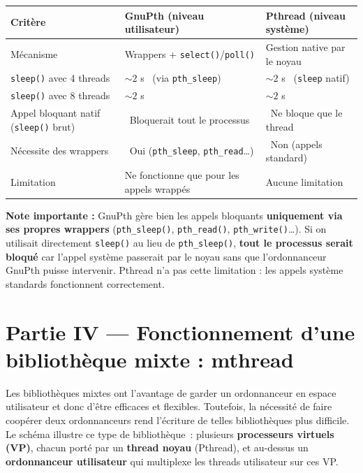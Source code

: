 \documentclass[11pt,a4paper]{article}
\newcommand{\cmark}{\ding{51}}
\newcommand{\xmark}{\ding{55}}
\let\oldtexttt\texttt
\renewcommand{\texttt}[1]{\oldtexttt{\color{keyword}#1}}
\begin{document}
\begin{center}
\renewcommand{\arraystretch}{1.2}
\setlength{\tabcolsep}{4pt}
\small
\begin{tabularx}{\textwidth}{|>{\raggedright\arraybackslash}p{2.8cm}|>{\raggedright\arraybackslash}X|>{\raggedright\arraybackslash}X|}
\hline
\textbf{Critère} & \textbf{GnuPth (niveau utilisateur)} & \textbf{Pthread (niveau système)} \\
\hline
Mécanisme & Wrappers + \texttt{select()}/\texttt{poll()} & Gestion native par le noyau \\
\hline
\texttt{sleep()} avec 4 threads & \(\sim 2\) s \cmark\ (via \texttt{pth\_sleep}) & \(\sim 2\) s \cmark\ (\texttt{sleep} natif) \\
\hline
\texttt{sleep()} avec 8 threads & \(\sim 2\) s \cmark & \(\sim 2\) s \cmark \\
\hline
Appel bloquant natif (\texttt{sleep()} brut) & \xmark\ Bloquerait tout le processus & \cmark\ Ne bloque que le thread \\
\hline
Nécessite des wrappers & \cmark\ Oui (\texttt{pth\_sleep}, \texttt{pth\_read}\ldots) & \xmark\ Non (appels standard) \\
\hline
Limitation & Ne fonctionne que pour les appels wrappés & Aucune limitation \\
\hline
\end{tabularx}
\end{center}

\textbf{Note importante :} GnuPth gère bien les appels bloquants \textbf{uniquement via ses propres wrappers} (\texttt{pth\_sleep()}, \texttt{pth\_read()}, \texttt{pth\_write()}\ldots). Si on utilisait directement \texttt{sleep()} au lieu de \texttt{pth\_sleep()}, \textbf{tout le processus serait bloqué} car l'appel système passerait par le noyau sans que l'ordonnanceur GnuPth puisse intervenir. Pthread n'a pas cette limitation : les appels système standards fonctionnent correctement.

\section{Partie IV — Fonctionnement d'une bibliothèque mixte : mthread}

Les bibliothèques mixtes ont l'avantage de garder un ordonnanceur en espace utilisateur et donc d'être efficaces et flexibles. Toutefois, la nécessité de faire coopérer deux ordonnanceurs rend l'écriture de telles bibliothèques plus difficile. Le schéma illustre ce type de bibliothèque~: plusieurs \textbf{processeurs virtuels (VP)}, chacun porté par un \textbf{thread noyau} (Pthread), et au-dessus un \textbf{ordonnanceur utilisateur} qui multiplexe les threads utilisateur sur ces VP.
\end{document}
